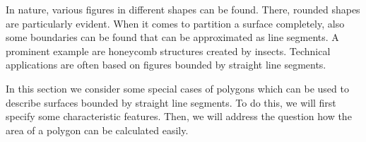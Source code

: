 


\begin{MIntro}

In nature, various figures in different shapes can be found. There, 
rounded shapes are particularly evident. When it comes to partition a surface 
completely, also some boundaries can be found that can be approximated as line 
segments. A prominent example are honeycomb structures created by 
insects. Technical applications are often based on figures bounded by straight 
line segments.
 

In this section we consider some special cases of polygons which can be 
used to describe surfaces bounded by straight line segments. To do this, we
will first specify some characteristic features. Then, we will address the 
question how the area of a polygon can be calculated easily.
\end{MIntro}


